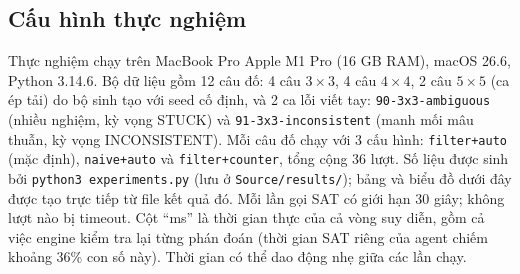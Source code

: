 \documentclass{article}
\newcommand{\code}[1]{\texttt{#1}}
\begin{document}
\subsection{Cấu hình thực nghiệm}
Thực nghiệm chạy trên MacBook Pro Apple M1 Pro (16 GB RAM), macOS 26.6, Python 3.14.6. Bộ dữ liệu gồm 12 câu đố: 4 câu $3\times3$, 4 câu $4\times4$, 2 câu $5\times5$ (ca ép tải) do bộ sinh tạo với seed cố định, và 2 ca lỗi viết tay: \code{90-3x3-ambiguous} (nhiều nghiệm, kỳ vọng STUCK) và \code{91-3x3-inconsistent} (manh mối mâu thuẫn, kỳ vọng INCONSISTENT). Mỗi câu đố chạy với 3 cấu hình: \code{filter+auto} (mặc định), \code{naive+auto} và \code{filter+counter}, tổng cộng 36 lượt. Số liệu được sinh bởi \code{python3 experiments.py} (lưu ở \code{Source/results/}); bảng và biểu đồ dưới đây được tạo trực tiếp từ file kết quả đó. Mỗi lần gọi SAT có giới hạn 30 giây; không lượt nào bị timeout. Cột ``ms'' là thời gian thực của cả vòng suy diễn, gồm cả việc engine kiểm tra lại từng phán đoán (thời gian SAT riêng của agent chiếm khoảng 36\% con số này). Thời gian có thể dao động nhẹ giữa các lần chạy.
\end{document}
